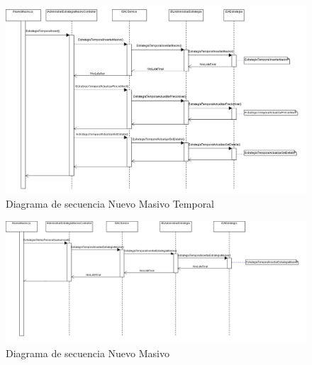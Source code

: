 \documentclass[a4paper,11pt]{paper}
\begin{document}
\newpage
\begin{landscape}
\begin{figure}[!h]
\centering
\includegraphics[width=1.5\textwidth]{imgs/Estrategia/NuevoMasivoTemporal.png}
\caption{Diagrama de secuencia Nuevo Masivo Temporal}
\end{figure}

\newpage
\begin{figure}[!h]
\centering
\includegraphics[width=1.5\textwidth]{imgs/Estrategia/NuevoMasivo.png}
\caption{Diagrama de secuencia Nuevo Masivo}
\end{figure}
\end{landscape} 






\newpage
\end{document}
